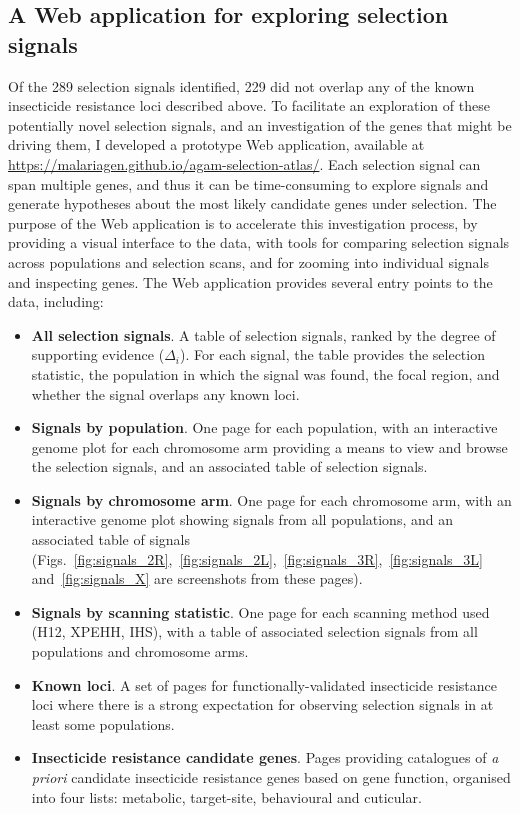 \documentclass[a4paper,11pt,abstracton,hidelinks]{scrartcl}
\begin{document}
\subsection{A Web application for exploring selection signals}\label{subsec:webapp}


Of the 289 selection signals identified, 229 did not overlap any of the known insecticide resistance loci described above.
%
To facilitate an exploration of these potentially novel selection signals, and an investigation of the genes that might be driving them, I developed a prototype Web application, available at \url{https://malariagen.github.io/agam-selection-atlas/}.
%
Each selection signal can span multiple genes, and thus it can be time-consuming to explore signals and generate hypotheses about the most likely candidate genes under selection.
%
The purpose of the Web application is to accelerate this investigation process, by providing a visual interface to the data, with tools for comparing selection signals across populations and selection scans, and for zooming into individual signals and inspecting genes.
%
The Web application provides several entry points to the data, including:
%
\begin{itemize}
    \item \textbf{All selection signals}.
    A table of selection signals, ranked by the degree of supporting evidence ($\Delta_i$).
    For each signal, the table provides the selection statistic, the population in which the signal was found, the focal region, and whether the signal overlaps any known loci.
    \item \textbf{Signals by population}.
    One page for each population, with an interactive genome plot for each chromosome arm providing a means to view and browse the selection signals, and an associated table of selection signals.
    \item \textbf{Signals by chromosome arm}.
    One page for each chromosome arm, with an interactive genome plot showing signals from all populations, and an associated table of signals (Figs.~\ref{fig:signals_2R},~\ref{fig:signals_2L},~\ref{fig:signals_3R},~\ref{fig:signals_3L} and~\ref{fig:signals_X} are screenshots from these pages).
    \item \textbf{Signals by scanning statistic}.
    One page for each scanning method used (H12, XPEHH, IHS), with a table of associated selection signals from all populations and chromosome arms.
    \item \textbf{Known loci}.
    A set of pages for functionally-validated insecticide resistance loci where there is a strong expectation for observing selection signals in at least some populations.
    \item \textbf{Insecticide resistance candidate genes}.
    Pages providing catalogues of \textit{a priori} candidate insecticide resistance genes based on gene function, organised into four lists: metabolic, target-site, behavioural and cuticular.
\end{itemize}
\end{document}
